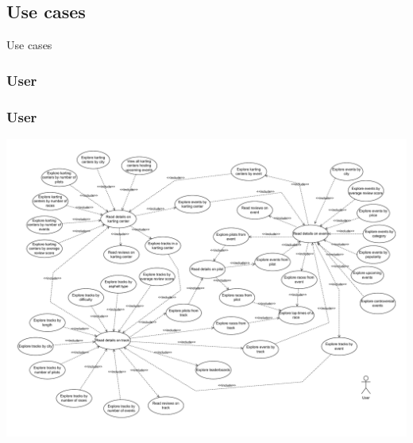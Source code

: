 \documentclass{beamer}
\begin{document}


\subsection{Use cases}

\begin{frame}{Use cases}

\end{frame}


\subsubsection{User}

\begin{frame}
    \frametitle{User}
    \centering
    \includegraphics[width=0.8\linewidth]{drawio/user.pdf}
\end{frame}

\end{document}
